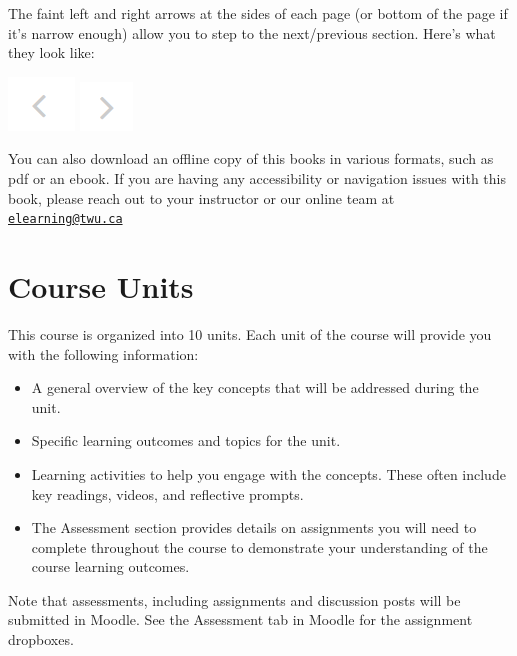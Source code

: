 \documentclass[
]{book}
\providecommand{\tightlist}{%
  \setlength{\itemsep}{0pt}\setlength{\parskip}{0pt}}
\begin{document}
The faint left and right arrows at the sides of each page (or bottom of the page if it's narrow enough) allow you to step to the next/previous section. Here's what they look like:

\includegraphics{assets/course-intro/left_arrow.png} \includegraphics{assets/course-intro/right_arrow.png}

You can also download an offline copy of this books in various formats, such as pdf or an ebook. If you are having any accessibility or navigation issues with this book, please reach out to your instructor or our online team at \href{mailto:elearning@twu.ca}{\nolinkurl{elearning@twu.ca}}

\hypertarget{course-units}{%
\section*{Course Units}\label{course-units}}

This course is organized into 10 units. Each unit of the course will provide you with the following information:

\begin{itemize}
\tightlist
\item
  A general overview of the key concepts that will be addressed during the unit.
\item
  Specific learning outcomes and topics for the unit.
\item
  Learning activities to help you engage with the concepts. These often include key readings, videos, and reflective prompts.
\item
  The Assessment section provides details on assignments you will need to complete throughout the course to demonstrate your understanding of the course learning outcomes.
\end{itemize}

\begin{caution}
 Note that assessments, including assignments and discussion posts will
 be submitted in Moodle. See the Assessment tab in Moodle for the
 assignment dropboxes.
 \end{caution}
\end{document}
